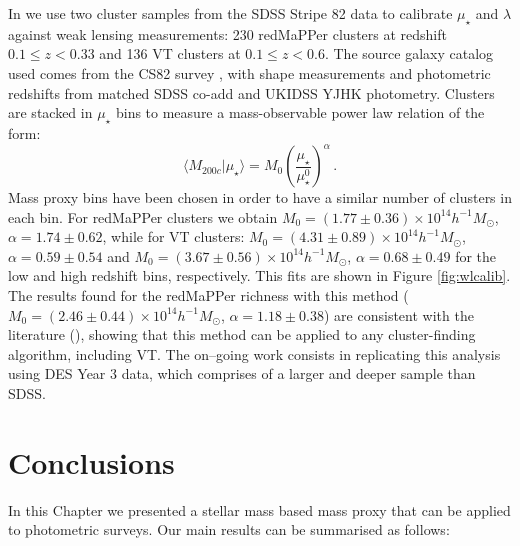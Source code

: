 In \citet{maria} we use two cluster samples from the SDSS Stripe 82 data to calibrate $\mu_\star$ and $\lambda$ against weak lensing measurements: 230 redMaPPer clusters at redshift $0.1\leq z<0.33$ and 136 VT clusters at $0.1 \leq z < 0.6$. The source galaxy catalog used comes from the CS82 survey \citep{erben2017}, with shape measurements and photometric redshifts from matched SDSS co-add \citep{2014ApJ...794..120A} and UKIDSS YJHK \citep{UKIDSS} photometry. Clusters are stacked in $\mu_{\star}$ bins to measure a mass-observable power law relation of the form:
\begin{equation}
\langle M_{200c} | \mu_{\star} \rangle = M_0 \left(\frac{\mu_{\star}}{\mu_{\star}^0}\right)^{\alpha}\,.
\label{massstellar}
\end{equation}
Mass proxy bins have been chosen in order to have a similar number of clusters in each bin. For redMaPPer clusters we obtain $M_0 = (1.77 \pm 0.36) \times 10^{14}h^{-1} M_{\odot}$, $\alpha = 1.74 \pm 0.62$, while for VT clusters: $M_0 = (4.31 \pm 0.89) \times 10^{14}h^{-1} M_{\odot}$, $\alpha = 0.59 \pm 0.54$ and $M_0 = (3.67 \pm 0.56) \times 10^{14}h^{-1} M_{\odot}$, $\alpha = 0.68 \pm 0.49$ for the low and high redshift bins, respectively. This fits are shown in Figure \ref{fig:wlcalib}. The results found for the redMaPPer richness with this method ($M_0 = (2.46 \pm 0.44) \times 10^{14}h^{-1} M_{\odot}$, $\alpha = 1.18 \pm 0.38$) are consistent with the literature (\citealt{2017MNRAS.466.3103S,2017MNRAS.469.4899M,oguri}), showing that this method can be applied to any cluster-finding algorithm, including VT. The on--going work consists in replicating this analysis using DES Year 3 data, which comprises of a larger and deeper sample than SDSS.




\section{Conclusions}\label{sec:conclusion}
In this Chapter we presented a stellar mass based mass proxy that can be applied to photometric surveys. Our main results can be summarised as follows:

